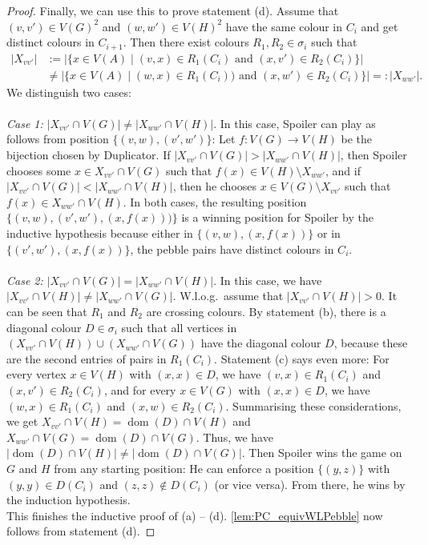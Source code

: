 \documentclass[10pt,a4paper]{article}
\newcommand{\lra}{\longrightarrow}
\newcommand{\dom}{\operatorname{dom}}
\begin{document}
\begin{proof}
			Finally, we can use this to prove statement (d). Assume that $(v,v') \in V(G)^2$ and $(w,w') \in V(H)^2$ have the same colour in $C_i$ and get distinct colours in $C_{i+1}$. Then there exist colours $R_1, R_2 \in \sigma_i$ such that 
			\begin{align*}
				| X_{vv'} | &:= |\{  x \in V(A) \mid (v,x) \in R_1(C_i) \text{ and } (x,v') \in R_2(C_i)   \}| \\
				&\neq |\{ x \in V(A) \mid (w,x) \in R_1(C_i)) \text{ and } (x,w') \in R_2(C_i)  \}| =: | X_{ww'} |.
			\end{align*}
			We distinguish two cases:\\
			\\
			\textit{Case 1:} $|X_{vv'} \cap V(G)| \neq |X_{ww'} \cap V(H)|$. In this case, Spoiler can play as follows from position $\{(v,w),(v',w')\}$: Let $f : V(G) \lra V(H)$ be the bijection chosen by Duplicator. If $|X_{vv'} \cap V(G)| > |X_{ww'} \cap V(H)|$, then Spoiler chooses some $x \in X_{vv'} \cap V(G)$ such that $f(x) \in V(H) \setminus X_{ww'}$, and if $|X_{vv'} \cap V(G)| < |X_{ww'} \cap V(H)|$, then he chooses $x \in V(G) \setminus X_{vv'}$ such that $f(x) \in X_{ww'} \cap V(H)$. In both cases, the resulting position $\{(v,w),(v',w'), (x,f(x)))\}$ is a winning position for Spoiler by the inductive hypothesis because either in $\{ (v,w), (x,f(x))  \}$ or in $\{ (v',w'), (x,f(x)) \}$, the pebble pairs have distinct colours in $C_i$.\\
			\\
			\textit{Case 2:} $|X_{vv'} \cap V(G)| = |X_{ww'} \cap V(H)|$. In this case, we have $|X_{vv'} \cap V(H)| \neq | X_{ww'} \cap V(G) |$. W.l.o.g.\ assume that $|X_{vv'} \cap V(H)| > 0$. It can be seen that $R_1$ and $R_2$ are crossing colours. By statement (b), there is a diagonal colour $D \in \sigma_i$ such that all vertices in $(X_{vv'} \cap V(H)) \cup (X_{ww'} \cap V(G))$ have the diagonal colour $D$, because these are the second entries of pairs in $R_1(C_i)$. Statement (c) says even more: For every vertex $x \in V(H)$ with $(x,x) \in D$, we have $(v,x) \in R_1(C_i)$ and $(x,v') \in R_2(C_i)$, and for every $x \in V(G)$ with $(x,x) \in D$, we have $(w,x) \in R_1(C_i)$ and $(x,w) \in R_2(C_i)$. Summarising these considerations, we get $X_{vv'} \cap V(H) = \dom (D) \cap V(H)$ and $X_{ww'} \cap V(G) = \dom(D) \cap V(G)$. Thus, we have  
			$|\dom (D) \cap V(H)| \neq | \dom(D) \cap V(G) |$. Then Spoiler wins the game on $G$ and $H$ from any starting position: He can enforce a position $\{  (y,z)   \}$ with $(y,y) \in D(C_i)$ and $(z,z) \notin D(C_i)$ (or vice versa). From there, he wins by the induction hypothesis.\\
			This finishes the inductive proof of (a) -- (d).
			\autoref{lem:PC_equivWLPebble} now follows from statement (d).
		\end{proof}
		
\end{document}
